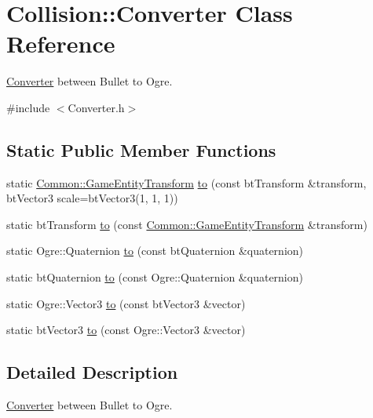 \hypertarget{class_collision_1_1_converter}{}\section{Collision\+:\+:Converter Class Reference}
\label{class_collision_1_1_converter}


\hyperlink{class_collision_1_1_converter}{Converter} between Bullet to Ogre.  




{\ttfamily \#include $<$Converter.\+h$>$}

\subsection*{Static Public Member Functions}
\begin{DoxyCompactItemize}
\item 
static \hyperlink{struct_common_1_1_game_entity_transform}{Common\+::\+Game\+Entity\+Transform} \hyperlink{class_collision_1_1_converter_a1b08b8571e6e0973029e6eb492cd7888}{to} (const bt\+Transform \&transform, bt\+Vector3 scale=bt\+Vector3(1, 1, 1))
\item 
static bt\+Transform \hyperlink{class_collision_1_1_converter_a532db90a9789b9fdabe21bd5e8f0fcfc}{to} (const \hyperlink{struct_common_1_1_game_entity_transform}{Common\+::\+Game\+Entity\+Transform} \&transform)
\item 
static Ogre\+::\+Quaternion \hyperlink{class_collision_1_1_converter_a303519e4c318cca485ca02399b6a1ed3}{to} (const bt\+Quaternion \&quaternion)
\item 
static bt\+Quaternion \hyperlink{class_collision_1_1_converter_a0ed727c0a2fa4df0409cf0f7e98fe7ce}{to} (const Ogre\+::\+Quaternion \&quaternion)
\item 
static Ogre\+::\+Vector3 \hyperlink{class_collision_1_1_converter_a55c293e2329b62d00c6bd295142b7671}{to} (const bt\+Vector3 \&vector)
\item 
static bt\+Vector3 \hyperlink{class_collision_1_1_converter_a38f61c45f9f05299d3152c729614252c}{to} (const Ogre\+::\+Vector3 \&vector)
\end{DoxyCompactItemize}


\subsection{Detailed Description}
\hyperlink{class_collision_1_1_converter}{Converter} between Bullet to Ogre. 

